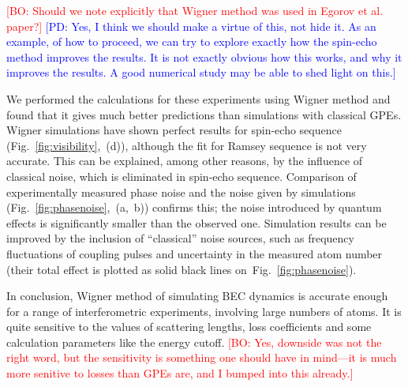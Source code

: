 \documentclass[aps,prl,twocolumn,showpacs,amsmath,amssymb,superscriptaddress]{revtex4-1}
\newcommand{\bogdansremark}[1]{\textcolor{red}{{[}BO: #1{]}}}
\newcommand{\petersremark}[1]{\textcolor{blue}{{[}PD: #1{]}}}
\newcommand{\figref}[1]{Fig.~\ref{#1}}
\begin{document}
	\bogdansremark{Should we note explicitly that Wigner method was used in Egorov et al. paper?}
	\petersremark{Yes, I think we should make a virtue of this, not hide it.
	As an example, of how to proceed, we can try to explore exactly
	how the spin-echo method improves the results.
	It is not exactly obvious how this works, and why it improves the results.
	A good numerical study may be able to shed light on this.}

We performed the calculations for these experiments using Wigner method and found that
it gives much better predictions than simulations with classical GPEs.
Wigner simulations have shown perfect results for spin-echo sequence (\figref{fig:visibility},~(d)),
although the fit for Ramsey sequence is not very accurate.
This can be explained, among other reasons, by the influence of classical noise,
which is eliminated in spin-echo sequence.
Comparison of experimentally measured phase noise and the noise given by simulations
(\figref{fig:phasenoise},~(a,~b)) confirms this;
the noise introduced by quantum effects is significantly smaller than the observed one.
Simulation results can be improved by the inclusion of ``classical'' noise sources,
such as frequency fluctuations of coupling pulses and uncertainty in the measured atom number
(their total effect is plotted as solid black lines on~\figref{fig:phasenoise}).

In conclusion, Wigner method of simulating BEC dynamics
is accurate enough for a range of interferometric experiments,
involving large numbers of atoms.
It is quite sensitive to the values of scattering lengths,
loss coefficients and some calculation parameters like the energy cutoff.
	\bogdansremark{Yes, downside was not the right word,
	but the sensitivity is something one should have in mind---it is much more senitive to losses
	than GPEs are, and I bumped into this already.}


\end{document}

